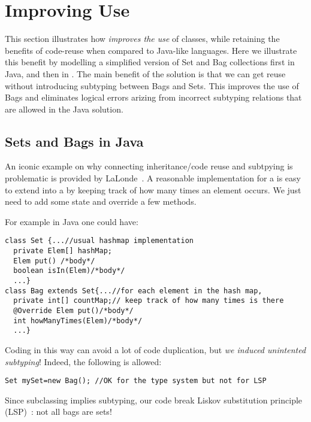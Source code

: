 \section{Improving Use}

This section illustrates how 
\name \emph{improves the use} of classes, while
retaining the benefits of code-reuse when compared to Java-like languages. 
Here we illustrate this benefit by modelling a simplified version of
Set and Bag collections first in Java, and then in \name.
The main benefit of the \name solution is that we can get reuse 
without introducing subtyping between Bags and Sets. This improves the 
use of Bags and eliminates logical errors arizing from incorrect
subtyping relations that are allowed in the Java solution. 

\subsection{Sets and Bags in Java}
An iconic example on why connecting inheritance/code reuse and
subtpying is problematic is provided by
LaLonde~\cite{LaLonde:1991:SSS:110673.110679}.  A reasonable
implementation for a \Q@Set@ is easy to extend into a \Q@Bag@ by
keeping track of how many times an element occurs.  We just need to
add some state and override a few methods.

For example in Java one could have:

\begin{lstlisting}
class Set {...//usual hashmap implementation
  private Elem[] hashMap;
  Elem put() /*body*/
  boolean isIn(Elem)/*body*/
  ...}
class Bag extends Set{...//for each element in the hash map,
  private int[] countMap;// keep track of how many times is there
  @Override Elem put()/*body*/
  int howManyTimes(Elem)/*body*/
  ...}\end{lstlisting}

\noindent Coding \Q@Bag@ in this way can avoid a lot of code
duplication, but \emph{we induced unintented subtyping}! 
Indeed, the following is allowed:

\begin{lstlisting}
Set mySet=new Bag(); //OK for the type system but not for LSP
\end{lstlisting}
Since subclassing implies subtyping, our code break Liskov substitution principle (LSP)~\cite{martin2000design}: not all bags are sets!

